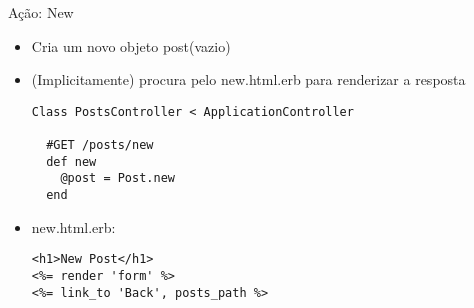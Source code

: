 \begin{frame}{Ação: New}
	\begin{itemize}
		\item Cria um novo objeto \alert{post}(vazio) 
		\item (Implicitamente) procura pelo \alert{new.html.erb} para renderizar a resposta
		\begin{lstlisting}[style=RubyInputStyle, caption=posts\_controller.rb]
Class PostsController < ApplicationController

  #GET /posts/new  
  def new
    @post = Post.new 
  end 
		\end{lstlisting}		
\framebreak
		\item \alert{new.html.erb}:
		\begin{lstlisting}[style=RubyInputStyle, caption=views/posts/new.html.erbb]
<h1>New Post</h1>
<%= render 'form' %>
<%= link_to 'Back', posts_path %>
		\end{lstlisting}
	\end{itemize}	
\end{frame}